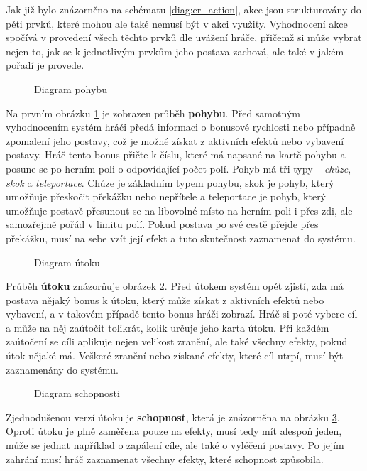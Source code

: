 Jak již bylo znázorněno na schématu \ref{diag:er_action}, akce jsou strukturovány do pěti prvků, které mohou ale také nemusí být v akci využity. Vyhodnocení akce spočívá v provedení všech těchto prvků dle uvážení hráče, přičemž si může vybrat nejen to, jak se k jednotlivým prvkům jeho postava zachová, ale také v jakém pořadí je provede.

\begin{figure}[h]
    \centering
    \caption{Diagram pohybu}
    \label{diag:movement}
\end{figure}

Na prvním obrázku \ref{diag:movement} je zobrazen průběh \textbf{pohybu}. Před samotným vyhodnocením systém hráči předá informaci o bonusové rychlosti nebo případně zpomalení jeho postavy, což je možné získat z aktivních efektů nebo vybavení postavy. Hráč tento bonus přičte k číslu, které má napsané na kartě pohybu a posune se po herním poli o odpovídající počet polí. Pohyb má tři typy -- \textit{chůze}, \textit{skok} a \textit{teleportace}. Chůze je základním typem pohybu, skok je pohyb, který umožňuje přeskočit překážku nebo nepřítele a teleportace je pohyb, který umožňuje postavě přesunout se na libovolné místo na herním poli i přes zdi, ale samozřejmě pořád v limitu polí. Pokud postava po své cestě přejde přes překážku, musí na sebe vzít její efekt a tuto skutečnost zaznamenat do systému.

\begin{figure}[h]
    \centering
    \caption{Diagram útoku}
    \label{diag:attack}
\end{figure}

Průběh \textbf{útoku} znázorňuje obrázek \ref{diag:attack}. Před útokem systém opět zjistí, zda má postava nějaký bonus k útoku, který může získat z aktivních efektů nebo vybavení, a v takovém případě tento bonus hráči zobrazí. Hráč si poté vybere cíl a může na něj zaútočit tolikrát, kolik určuje jeho karta útoku. Při každém zaútočení se cíli aplikuje nejen velikost zranění, ale také všechny efekty, pokud útok nějaké má. Veškeré zranění nebo získané efekty, které cíl utrpí, musí být zaznamenány do systému.

\begin{figure}[h]
    \centering
    \caption{Diagram schopnosti}
    \label{diag:skill}
\end{figure}

Zjednodušenou verzí útoku je \textbf{schopnost}, která je znázorněna na obrázku \ref{diag:skill}. Oproti útoku je plně zaměřena pouze na efekty, musí tedy mít alespoň jeden, může se jednat například o zapálení cíle, ale také o vyléčení postavy. Po jejím zahrání musí hráč zaznamenat všechny efekty, které schopnost způsobila.

